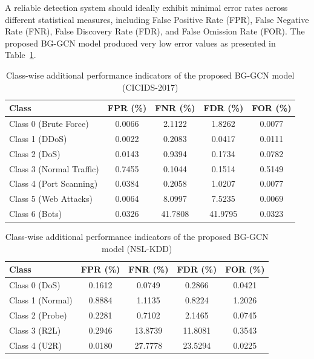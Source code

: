 \documentclass[a4paper,fleqn]{cas-sc}
\begin{document}
A reliable detection system should ideally exhibit minimal error rates across different statistical measures, including False Positive Rate (FPR), False Negative Rate (FNR), False Discovery Rate (FDR), and False Omission Rate (FOR). The proposed BG-GCN model produced very low error values as presented in Table~\ref{tab:error_rate}.

\begin{table}[htbp]
\caption{Class-wise additional performance indicators of the proposed BG-GCN model (CICIDS-2017)}\label{tab:error_rate}
\centering
\small
\begin{tabular}{@{}lcccc@{}}
\toprule
Class & FPR (\%) & FNR (\%) & FDR (\%) & FOR (\%) \\
\midrule
Class 0 (Brute Force) & 0.0066 & 2.1122 & 1.8262 & 0.0077 \\
Class 1 (DDoS) & 0.0022 & 0.2083 & 0.0417 & 0.0111 \\
Class 2 (DoS) & 0.0143 & 0.9394 & 0.1734 & 0.0782 \\
Class 3 (Normal Traffic) & 0.7455 & 0.1044 & 0.1514 & 0.5149 \\
Class 4 (Port Scanning) & 0.0384 & 0.2058 & 1.0207 & 0.0077 \\
Class 5 (Web Attacks) & 0.0064 & 8.0997 & 7.5235 & 0.0069 \\
Class 6 (Bots) & 0.0326 & 41.7808 & 41.9795 & 0.0323 \\
\bottomrule
\end{tabular}
\end{table}

\begin{table}[htbp]
\caption{Class-wise additional performance indicators of the proposed BG-GCN model (NSL-KDD)}\label{tab:classwise_nslkdd}
\centering
\small
\begin{tabular}{@{}lcccc@{}}
\toprule
Class & FPR (\%) & FNR (\%) & FDR (\%) & FOR (\%) \\
\midrule
Class 0 (DoS) & 0.1612 & 0.0749 & 0.2866 & 0.0421 \\
Class 1 (Normal) & 0.8884 & 1.1135 & 0.8224 & 1.2026 \\
Class 2 (Probe) & 0.2281 & 0.7102 & 2.1465 & 0.0745 \\
Class 3 (R2L) & 0.2946 & 13.8739 & 11.8081 & 0.3543 \\
Class 4 (U2R) & 0.0180 & 27.7778 & 23.5294 & 0.0225 \\
\bottomrule
\end{tabular}
\end{table}
\end{document}
